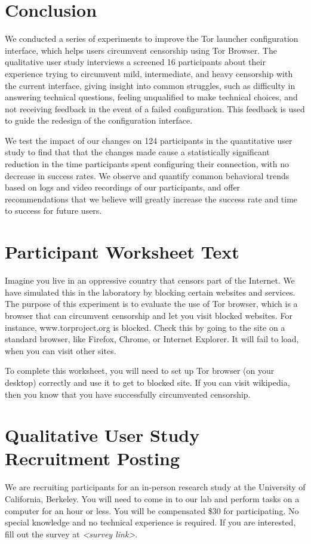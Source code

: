 \documentclass[USenglish,oneside,twocolumn]{article}
\begin{document}
\section{Conclusion} 
We conducted a series of experiments to improve the Tor launcher configuration interface, which helps users circumvent censorship using Tor Browser. The qualitative user study interviews a screened 16 participants about their experience trying to circumvent mild, intermediate, and heavy censorship with the current interface, giving insight into common struggles, such as difficulty in answering technical questions, feeling unqualified to make technical choices, and not receiving feedback in the event of a failed configuration. This feedback is used to guide the redesign of the configuration interface. 

We test the impact of our changes on 124 participants in the quantitative user study to find that that the changes made cause a statistically significant reduction in the time participants spent configuring their connection, with no decrease in success rates. We observe and quantify common behavioral trends based on logs and video recordings of our participants, and offer recommendations that we believe will greatly increase the success rate and time to success for future users. 




\appendix
\section{Participant Worksheet Text} 
\label{participant-worksheet}
Imagine you live in an oppressive country that censors part of the Internet. We have simulated this in the laboratory by blocking certain websites and services. The purpose of this experiment is to evaluate the use of Tor browser, which is a browser that can circumvent censorship and let you visit blocked websites. For instance, www.torproject.org is blocked. Check this by going to the site on a standard browser, like Firefox, Chrome, or Internet Explorer. It will fail to load, when you can visit other sites.

To complete this worksheet, you will need to set up Tor browser (on your desktop) correctly and use it to get to blocked site. If you can visit wikipedia, then you know that you have successfully circumvented censorship.

\section{Qualitative User Study Recruitment Posting} 
\label{qualitative-recruitment}
We are recruiting participants for an in-person research study at the University of California, Berkeley. You will need to come in to our lab and perform tasks on a computer for an hour or less. You will be compensated \$30 for participating. 
No special knowledge and no technical experience is required. If you are interested, fill out the survey at \textit{<survey link>}. 
\end{document}
